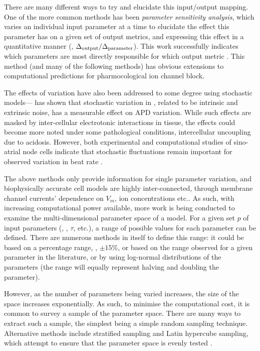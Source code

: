 \documentclass[../thesis-main.tex]{subfiles}
\begin{document}
 There are many different ways to try and elucidate this input/output mapping. One of the more common methods has been \emph{parameter sensitivity analysis}, which varies an individual input parameter at a time to elucidate the effect this parameter has on a given set of output metrics, and expressing this effect in a quantitative manner (\idest{}, $\Delta_\textnormal{output}/\Delta_\textnormal{parameter}$). This work successfully indicates which parameters are most directly responsible for which output metric \citep{Nygren1998, Romero2009, Romero2010, Corrias2011, Romero2011}. This method (and many of the following methods) has obvious extensions to computational predictions for pharmocological ion channel block.
 
 The effects of variation have also been addressed to some degree using stochastic models---\citet{Pueyo2011} has shown that stochastic variation in \iks{}, related to be intrinsic and extrinsic noise, has a measurable effect on APD variation. While such effects are masked by inter-cellular electrotonic interactions in tissue, the effects could become more noted under some pathological conditions, \eg{} intercellular uncoupling due to acidosis. However, both experimental and computational studies of sino-atrial node cells indicate that stochastic fluctuations remain important for observed variation in beat rate \citep{Ponard2007}.
 
 The above methods only provide information for single parameter variation, and biophysically accurate cell models are highly inter-connected, through membrane channel currents' dependence on $V_m$, ion concentrations etc.. As such, with increasing computational power available, more work is being conducted to examine the multi-dimensional parameter space of a model. For a given set $p$ of input parameters (\eg{}, \gnak{}, $\tau$, etc.), a range of possible values for each parameter can be defined. There are numerous methods in itself to define this range: it could be based on a percentage range, \eg{}, $\pm15\%$, or based on the range observed for a given parameter in the literature, or by using log-normal distributions of the parameters (the range will equally represent halving and doubling the parameter).
 
 However, as the number of parameters being varied increases, the size of the space increases exponentially. As such, to minimise the computational cost, it is common to survey a sample of the parameter space. There are many ways to extract such a sample, the simplest being a simple random sampling technique. Alternative methods include stratified sampling and Latin hypercube sampling, which attempt to ensure that the parameter space is evenly tested \citep{McKay1979}.
 
\end{document}
